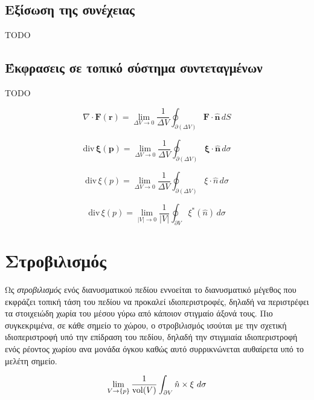 \documentclass[10pt,a4paper,twoside,openany]{book}
\theoremstyle{plain}
\theoremstyle{definition}
\theoremstyle{remark}
\numberwithin{equation}{section}
\begin{document}
\section{Εξίσωση της συνέχειας}

TODO

\section{Έκφρασεις σε τοπικό σύστημα συντεταγμένων}

TODO

\begin{equation}
\nabla \cdot \mathbf{F}(\mathbf{r}) = 
\lim_{\Delta V \to 0} 
\frac{1}{\Delta V}
\oint_{\partial(\Delta V)} \mathbf{F} \cdot \hat{\mathbf{n}} \, dS
\end{equation}

\begin{equation}
\text{div} \, \boldsymbol{\xi}(\mathbf{p}) = 
\lim_{\Delta V \to 0} 
\frac{1}{\Delta V}
\oint_{\partial(\Delta V)} \boldsymbol{\xi} \cdot \hat{\mathbf{n}} \, d\sigma
\end{equation}

\begin{equation}
\text{div} \, \xi(p) = 
\lim_{\Delta V \to 0} 
\frac{1}{\Delta V}
\oint_{\partial(\Delta V)} \xi \cdot \hat{n} \, d\sigma
\end{equation}

\begin{equation}
\text{div} \, \xi(p) = 
\lim_{|V| \to 0} 
\frac{1}{|V|}
\oint_{\partial V} \xi^*(\hat{n}) \, d\sigma
\end{equation}


\chapter{Στροβιλισμός}

Ως \textit{στροβιλισμός} ενός διανυσματικού πεδίου εννοείται
το διανυσματικό μέγεθος που εκφράζει τοπική τάση του πεδίου
να προκαλεί ιδιοπεριστροφές,
δηλαδή να περιστρέφει τα στοιχειώδη χωρία του μέσου
γύρω από κάποιον στιγμαίο άξονά τους.
Πιο συγκεκριμένα, σε κάθε σημείο το χώρου,
ο στροβιλισμός ισούται με την σχετική ιδιοπεριστροφή υπό την επίδραση του πεδίου,
δηλαδή την στιγμιαία ιδιοπεριστροφή ενός ρέοντος χωρίου ανα μονάδα όγκου
καθώς αυτό συρρικνώνεται αυθαίρετα υπό το μελέτη σημείο.

\begin{equation}
\lim_{\substack{V \to \{p\}}}
\frac{1}{\operatorname{vol} (V)}
\hspace{-0pt}
\int_{\partial V} \hat{n} \times \xi \,\, d\sigma
\end{equation}
\end{document}

